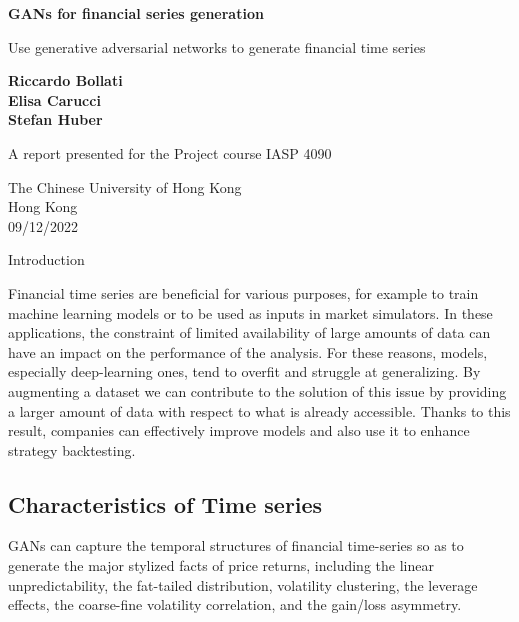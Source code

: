 \documentclass{article}
\begin{document}
\begin{titlepage}
    \begin{center}
        \vspace*{1cm}
            
        \Huge
        \textbf{GANs for financial series generation}
            
        \vspace{0.5cm}
        \LARGE
        Use generative adversarial networks to generate financial time series
            
        \vspace{1.5cm}
            
        \textbf{Riccardo Bollati}\\
        \textbf{Elisa Carucci}\\
        \textbf{Stefan Huber}

            
        \vfill
            
        A report presented for the Project course IASP 4090\\
            
        \vspace{0.8cm}
            
        \Large
        The Chinese University of Hong Kong\\
        Hong Kong\\
        09/12/2022
            
    \end{center}
\end{titlepage}


\begin{center}
    {\huge{Introduction}}
\end{center}  
\begin{multicols}{2}
    Financial time series are beneficial for various purposes, for example to train machine learning models or to be used as inputs in market simulators. In these applications, the constraint of limited availability of large amounts of data can have an impact on the performance of the analysis. For these reasons, models, especially deep-learning ones, tend to overfit and struggle at generalizing. By augmenting a dataset we can contribute to the solution of this issue by providing a larger amount of data with respect to what is already accessible. Thanks to this result, companies can effectively  improve models and also use it to enhance strategy backtesting. 
    \subsection*{Characteristics of Time series}
    GANs can capture the temporal structures of financial time-series so as to generate the major stylized facts of price returns, including the linear unpredictability, the fat-tailed distribution, volatility clustering, the leverage effects, the coarse-fine volatility correlation, and the gain/loss asymmetry. 
\end{multicols}    
\end{document}
